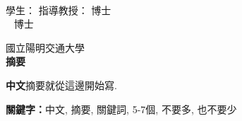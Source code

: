\begin{center}
    \large
    \begin{singlespace}    
        \textbf{\chineseTitle{}} \\[0.5cm]
    \end{singlespace}

    \begin{singlespace}    
    學生：\studentCnName  \hspace{2.5cm}  指導教授：\advisorCnName \hspace{0.1cm} 博士 \\

    \ifdefined\advisorCnNameB %
        \hspace{9.6cm}  \advisorCnNameB ~ 博士 \\
    \fi
    \end{singlespace}

    \vspace{0.5cm}

    國立陽明交通大學\ \NameofDepartmentInstituteCN\ \iftoggle{iamphd}{博士班}{碩士班} \\[0.5cm]
    \textbf{摘\hspace{1cm}要} \\[0.5cm]

\end{center}

\normalsize 

\textbf{中文}摘要就從這邊開始寫.

\vspace{1cm}

\textbf{關鍵字：}中文, 摘要, 關鍵詞, 5-7個, 不要多, 也不要少
